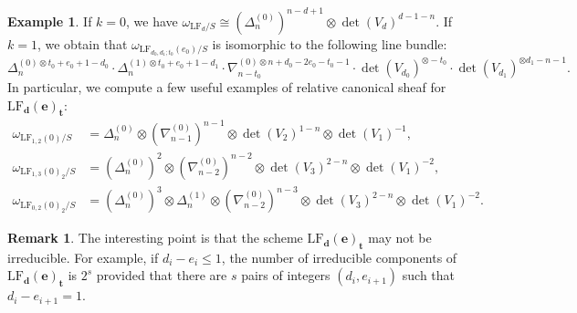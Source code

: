 \documentclass[a4paper]{amsart}
\theoremstyle{plain}
\theoremstyle{definition}
\newtheorem{example}[theorem]{Example}
\newtheorem{remark}[theorem]{Remark}
\numberwithin{equation}{section}
\newcommand{\LF}{\mathrm{LF}}
\begin{document}
\begin{example}\label{exm:LF012-132-022}
    If $k=0$, we have $ \omega_{\LF_{d}/S} \cong (\Delta_n^{(0)})^{n-d+1} \otimes \det(V_d)^{d-1-n}$. If $k =1$, we obtain that $\omega_{\LF_{d_0,d_1 ;t_0}(e_0)/S}$ is isomorphic to the following line bundle:
    \[
        \Delta_n^{(0)\otimes t_0 + e_0 + 1 - d_0} \cdot \Delta_n^{(1)\otimes t_0 + e_0 +1 - d_1} \cdot \nabla_{n-t_0}^{(0)\otimes n + d_0 - 2e_0 - t_0 - 1} \cdot \det(V_{d_0})^{\otimes -t_0} \cdot \det(V_{d_1})^{\otimes d_1-n-1}.
    \]
    In particular, we compute a few useful examples of relative canonical sheaf for $\LF_{\mathbf{d}}(\mathbf{e})_{\mathbf{t}}$:
    \[ \begin{aligned}
            \omega_{\LF_{1,2}(0)/S}   & = \Delta_n^{(0)} \otimes (\nabla_{n-1}^{(0)})^{n-1} \otimes \det(V_2)^{1-n}
            \otimes \det(V_1)^{-1} ,                                                                                                             \\
            \omega_{\LF_{1,3}(0)_2/S} & = (\Delta_n^{(0)})^2 \otimes (\nabla_{n-2}^{(0)})^{n-2}  \otimes \det(V_3)^{2-n}
            \otimes \det(V_1)^{-2},                                                                                                              \\
            \omega_{\LF_{0,2}(0)_2/S} & =  (\Delta_n^{(0)})^3 \otimes \Delta_n^{(1)} \otimes (\nabla_{n-2}^{(0)})^{n-3}  \otimes \det(V_3)^{2-n}
            \otimes \det(V_1)^{-2}.
        \end{aligned}\]
\end{example}

\begin{remark}\label{rmk:lf_irr_comp}
    The interesting point is that the scheme $\mathrm{LF}_{\mathbf{d}}(\mathbf{e})_{\mathbf{t}} $ may not be irreducible. For example, if $d_i -e_i \leq 1$, the number of irreducible components of $\mathrm{LF}_{\mathbf{d}}(\mathbf{e})_{\mathbf{t}}$ is $2^s$ provided that there are $s$ pairs of integers $(d_i,e_{i+1})$ such that $d_i -e_{i+1} =1$.
\end{remark}
\end{document}
